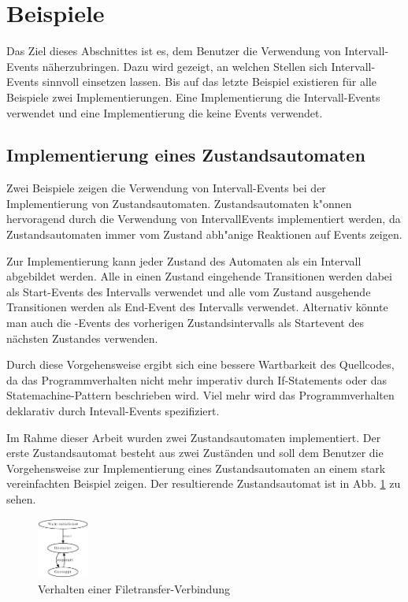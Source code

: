 \section{Beispiele}

Das Ziel dieses Abschnittes ist es, dem Benutzer die Verwendung von
Intervall-Events näherzubringen. Dazu wird gezeigt, an welchen Stellen sich
Intervall-Events sinnvoll einsetzen lassen. Bis auf das letzte Beispiel
existieren für alle Beispiele zwei Implementierungen. Eine Implementierung die
Intervall-Events verwendet und eine Implementierung die keine Events
verwendet.

\subsection{Implementierung eines Zustandsautomaten}
Zwei Beispiele zeigen die Verwendung von Intervall-Events bei der
Implementierung von Zustandsautomaten. Zustandsautomaten k"onnen hervoragend
durch die Verwendung von IntervallEvents implementiert werden, da
Zustandsautomaten immer vom Zustand abh"anige Reaktionen auf Events zeigen.

Zur Implementierung kann jeder Zustand des Automaten als ein Intervall
abgebildet werden. Alle in einen Zustand eingehende Transitionen werden dabei
als Start-Events des Intervalls verwendet und alle vom Zustand ausgehende
Transitionen werden als End-Event des Intervalls verwendet. Alternativ könnte
man auch die \after{}-Events des vorherigen Zustandsintervalls als Startevent
des nächsten Zustandes verwenden.

Durch diese Vorgehensweise ergibt sich eine bessere Wartbarkeit des
Quellcodes, da das Programmverhalten nicht mehr imperativ durch If-Statements
oder das Statemachine-Pattern beschrieben wird. Viel mehr wird das
Programmverhalten deklarativ durch Intevall-Events spezifiziert.

Im Rahme dieser Arbeit wurden zwei Zustandsautomaten implementiert. Der erste
Zustandsautomat besteht aus zwei Zuständen und soll dem Benutzer die
Vorgehensweise zur Implementierung eines Zustandsautomaten an einem stark
vereinfachten Beispiel zeigen. Der resultierende Zustandsautomat ist in Abb.
\ref{filetransfer_behaviour} zu sehen.

\begin{figure}[htp]
\begin{center}
  \includegraphics[width=0.15\textwidth]{graphics/tcp_stm.dot.eps}
  \caption{Verhalten einer Filetransfer-Verbindung}
  \label{filetransfer_behaviour}
\end{center}
\end{figure}


